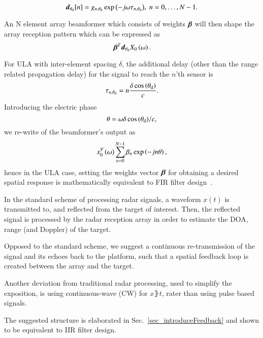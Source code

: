 \begin{equation}
    \label{eq:d}
    \vd_{\thetaD}[n] = g_{n,\thetaD}\exp{\rBrace{-j\omega\tau_{n,\thetaD}}},\;n=0,\ldots,N-1.
\end{equation}
\par An N element array beamformer which consists of weights $\boldsymbol{\beta}$ will then shape the array reception pattern which can be expressed as 
$$ \vBetaT\vd_{\thetaD}\F{x}_{0}\rBrace{\omega}. $$ 
\par For ULA with inter-element spacing $\delta$, the additional delay (other than the range related propagation delay) for the signal to reach the $n$'th sensor is
$$
\tau_{n,\theta_{\text{d}}}=n\frac{\delta\cos\left({\theta_{\text{d}}}\right)}{c}.
$$
Introducing the electric phase
\begin{equation}\label{eq:thetaULA}
\theta=\omega{\delta\cos\Brack{\thetaD}}/{c},
\end{equation}
we re-write of the beamformer's output as 
\[
x^\mathcal{F}_0(\omega)\sum_{n=0}^{N-1}\beta_n
\exp\left({-jn\theta}\right),
\]
hence in the ULA case, setting the weights vector $\boldsymbol{\beta}$ for obtaining a desired spatial response is mathematically equivalent to FIR filter design~\cite{VanVeenBeamforming:Filtering}.
\par In the standard scheme of processing radar signals, a waveform $x(t)$ is transmitted to, and reflected from the target of interest. Then, the reflected signal is processed by the radar reception array in order to estimate the DOA, range (and Doppler) of the target. 
\par Opposed to the standard scheme, we suggest a continuous re-transmission of the signal and its echoes back to the platform, such that a spatial feedback loop is created between the array and the target.
\par Another deviation from traditional radar processing, used to simplify the exposition, is using continuous-wave (CW) for $x\rBrace{t}$, rater than using pulse based signals. 
\par The suggested structure is elaborated in Sec.~\ref{sec_introduceFeedback} and shown to be equivalent to IIR filter design.